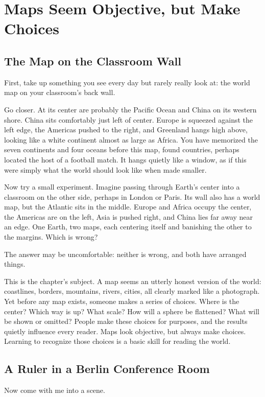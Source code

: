 \chapter{Maps Seem Objective, but Make Choices}
\section{The Map on the Classroom Wall}
First, take up something you see every day but rarely really look at: the world map on your classroom's back wall.

Go closer. At its center are probably the Pacific Ocean and China on its western shore. China sits comfortably just left of center. Europe is squeezed against the left edge, the Americas pushed to the right, and Greenland hangs high above, looking like a white continent almost as large as Africa. You have memorized the seven continents and four oceans before this map, found countries, perhaps located the host of a football match. It hangs quietly like a window, as if this were simply what the world should look like when made smaller.

Now try a small experiment. Imagine passing through Earth's center into a classroom on the other side, perhaps in London or Paris. Its wall also has a world map, but the Atlantic sits in the middle. Europe and Africa occupy the center, the Americas are on the left, Asia is pushed right, and China lies far away near an edge. One Earth, two maps, each centering itself and banishing the other to the margins. Which is wrong?

The answer may be uncomfortable: neither is wrong, and both have arranged things.

This is the chapter's subject. A map seems an utterly honest version of the world: coastlines, borders, mountains, rivers, cities, all clearly marked like a photograph. Yet before any map exists, someone makes a series of choices. Where is the center? Which way is up? What scale? How will a sphere be flattened? What will be shown or omitted? People make these choices for purposes, and the results quietly influence every reader. Maps look objective, but always make choices. Learning to recognize those choices is a basic skill for reading the world.

\section{A Ruler in a Berlin Conference Room}
Now come with me into a scene.

